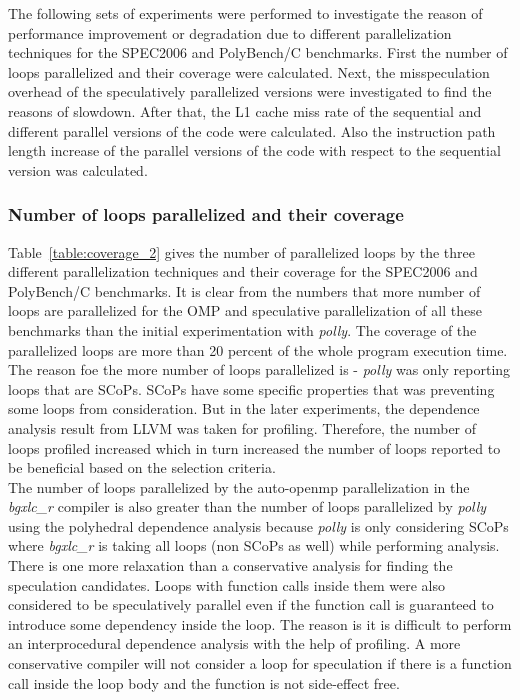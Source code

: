\documentclass[10pt]{report}          %
\begin{document}
The following sets of experiments were performed to investigate the reason of performance improvement or degradation due to different parallelization techniques for the SPEC2006 and PolyBench/C benchmarks.  First the number of loops parallelized and their coverage were calculated.  Next, the misspeculation overhead of the speculatively parallelized versions were investigated to find the reasons of slowdown.  After that, the L1 cache miss rate of the sequential and different parallel versions of the code were calculated.  Also the instruction path length increase of the parallel versions of the code with respect to the sequential version was calculated.

\subsubsection{Number of loops parallelized and their coverage}

Table~\ref{table:coverage_2} gives the number of parallelized loops by the three different parallelization techniques and their coverage for the SPEC2006 and PolyBench/C benchmarks.  It is clear from the numbers that more number of loops are parallelized for the OMP and speculative parallelization of all these benchmarks than the initial experimentation with \textit{polly}.  The coverage of the parallelized loops are more than 20 percent of the whole program execution time.  The reason foe the more number of loops parallelized is - \textit{polly} was only reporting loops that are SCoPs.  SCoPs have some specific properties that was preventing some loops from consideration.  But in the later experiments, the dependence analysis result from LLVM was taken for profiling.  Therefore, the number of loops profiled increased which in turn increased the number of loops reported to be beneficial based on the selection criteria.  \\

The number of loops parallelized by the auto-openmp parallelization in the \textit{bgxlc\_r} compiler is also greater than the number of loops parallelized by \textit{polly} using the polyhedral dependence analysis because \textit{polly} is only considering SCoPs where \textit{bgxlc\_r} is taking all loops (non SCoPs as well) while performing analysis.\\

There is one more relaxation than a conservative analysis for finding the speculation candidates.  Loops with function calls inside them were also considered to be speculatively parallel even if the function call is guaranteed to introduce some dependency inside the loop.  The reason is it is difficult to perform an interprocedural dependence analysis with the help of profiling.  A more conservative compiler will not consider a loop for speculation if there is a function call inside the loop body and the function is not side-effect free. \\
\end{document}
